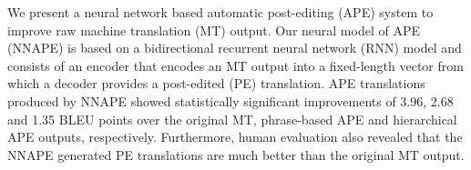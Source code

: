 We present a neural network based automatic post-editing (APE) system to improve raw machine translation (MT) output. Our neural model of APE (NNAPE) is based on a bidirectional recurrent neural network (RNN) model and consists of an encoder that encodes an MT output into a fixed-length vector from which a decoder provides a post-edited (PE) translation. APE translations produced by NNAPE showed statistically significant improvements of 3.96, 2.68 and 1.35 BLEU points over the original MT, phrase-based APE and hierarchical APE outputs, respectively. Furthermore, human evaluation also revealed that the NNAPE generated PE translations are much better than the original MT output.
